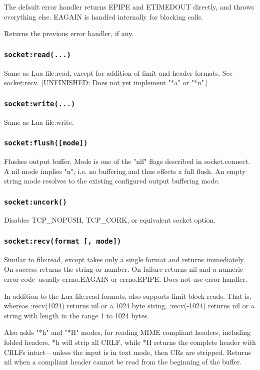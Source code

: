 \documentclass[11pt, oneside]{memoir}
\newcommand*{\fn}[1]{\texttt{#1}\xspace}
\begin{document}
	The default error handler returns EPIPE and ETIMEDOUT directly, and
	throws everything else. EAGAIN is handled internally for blocking
	calls.

	Returns the previous error handler, if any.

\subsubsection[\fn{socket:read}]{\fn{socket:read(...)}}
	Same as Lua file:read, except for addition of limit and header
	formats. See socket:recv. [UNFINISHED: Does not yet implement "*a"
	or "*n".]

\subsubsection[\fn{socket:write}]{\fn{socket:write(...)}}
	Same as Lua file:write.

\subsubsection[\fn{socket:flush}]{\fn{socket:flush([mode])}}
	Flushes output buffer. Mode is one of the "nlf" flags described in
	socket.connect. A nil mode implies "n", i.e. no buffering and thus
	effects a full flush. An empty string mode resolves to the existing
	configured output buffering mode.

\subsubsection[\fn{socket:uncork}]{\fn{socket:uncork()}}
	Disables TCP\_NOPUSH, TCP\_CORK, or equivalent socket option.

\subsubsection[\fn{socket:recv}]{\fn{socket:recv(format [, mode])}}
	Similar to file:read, except takes only a single format and returns
	immediately. On success returns the string or number. On failure
	returns nil and a numeric error code--usually errno.EAGAIN or
	errno.EPIPE. Does not use error handler.

	In addition to the Lua file:read formats, also supports limit block
	reads. That is, whereas :recv(1024) returns nil or a 1024 byte
	string, :recv(-1024) returns nil or a string with length in the
	range 1 to 1024 bytes.

	Also adds "*h" and "*H" modes, for reading MIME compliant headers,
	including folded headers. *h will strip all CRLF, while *H returns
	the complete header with CRLFs intact---unless the input is in text
	mode, then CRs are stripped. Returns nil when a compliant header
	cannot be read from the beginning of the buffer.
\end{document}
